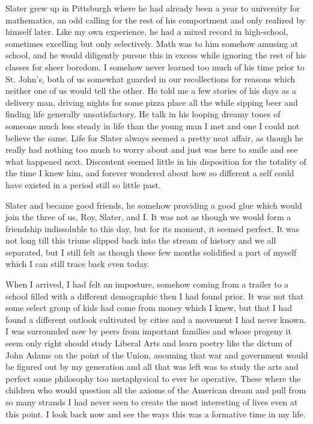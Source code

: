 \documentclass[ebook, 10pt, openright, onecolumn]{memoir}
\begin{document}
Slater grew up in Pittsburgh where he had already been a year to university for
mathematics, an odd calling for the rest of his comportment and only realized by
himself later.  Like my own experience, he had a mixed record in high-school,
sometimes excelling but only selectively.  Math was to him somehow amusing at
school, and he would diligently pursue this in excess while ignoring the rest of
his classes for sheer boredom.  I somehow never learned too much of his time
prior to St. John's, both of us somewhat guarded in our recollections for
reasons which neither one of us would tell the other.  He told me a few stories
of his days as a delivery man, driving nights for some pizza place all the while
sipping beer and finding life generally unsatisfactory.  He talk in his looping
dreamy tones of someone much less steady in life than the young man I met and
one I could not believe the same.  Life for Slater always seemed a pretty neat
affair, as though he really had nothing too much to worry about and just was
here to smile and see what happened next.  Discontent seemed little in his
disposition for the totality of the time I knew him, and forever wondered about
how so different a self could have existed in a period still so little past.

Slater and became good friends, he somehow providing a good glue which would
join the three of us, Roy, Slater, and I.  It was not as though we would form a
friendship indissoluble to this day, but for its moment, it seemed perfect.  It
was not long till this triune slipped back into the stream of history and we all
separated, but I still felt as though these few months solidified a part of
myself which I can still trace back even today.  

When I arrived, I had felt an imposture, somehow coming from a trailer to a
school filled with a different demographic then I had found prior.  It was not
that some select group of kids had come from money which I knew, but that I had
found a different outlook cultivated by cities and a movement I had never known.
I was surrounded now by peers from important families and whose progeny it seem
only right should study Liberal Arts and learn poetry like the dictum of John
Adams on the point of the Union, assuming that war and government would be
figured out by my generation and all that was left was to study the arts and
perfect some philosophy too metaphysical to ever be operative.  These where the
children who would question all the axioms of the American dream and pull from
so many strands I had never seen to create the most interesting of lives even at
this point.  I look back now and see the ways this was a formative time in my
life.
\end{document}
